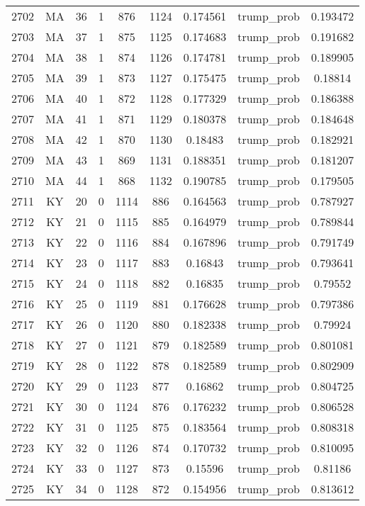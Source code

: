 \documentclass[12pt,a4paper]{article}
\begin{document}
\begin{tabular}{r|cccccccc}
	2702 & MA & 36 & 1 & 876 & 1124 & 0.174561 & trump\_prob & 0.193472 \\
	2703 & MA & 37 & 1 & 875 & 1125 & 0.174683 & trump\_prob & 0.191682 \\
	2704 & MA & 38 & 1 & 874 & 1126 & 0.174781 & trump\_prob & 0.189905 \\
	2705 & MA & 39 & 1 & 873 & 1127 & 0.175475 & trump\_prob & 0.18814 \\
	2706 & MA & 40 & 1 & 872 & 1128 & 0.177329 & trump\_prob & 0.186388 \\
	2707 & MA & 41 & 1 & 871 & 1129 & 0.180378 & trump\_prob & 0.184648 \\
	2708 & MA & 42 & 1 & 870 & 1130 & 0.18483 & trump\_prob & 0.182921 \\
	2709 & MA & 43 & 1 & 869 & 1131 & 0.188351 & trump\_prob & 0.181207 \\
	2710 & MA & 44 & 1 & 868 & 1132 & 0.190785 & trump\_prob & 0.179505 \\
	2711 & KY & 20 & 0 & 1114 & 886 & 0.164563 & trump\_prob & 0.787927 \\
	2712 & KY & 21 & 0 & 1115 & 885 & 0.164979 & trump\_prob & 0.789844 \\
	2713 & KY & 22 & 0 & 1116 & 884 & 0.167896 & trump\_prob & 0.791749 \\
	2714 & KY & 23 & 0 & 1117 & 883 & 0.16843 & trump\_prob & 0.793641 \\
	2715 & KY & 24 & 0 & 1118 & 882 & 0.16835 & trump\_prob & 0.79552 \\
	2716 & KY & 25 & 0 & 1119 & 881 & 0.176628 & trump\_prob & 0.797386 \\
	2717 & KY & 26 & 0 & 1120 & 880 & 0.182338 & trump\_prob & 0.79924 \\
	2718 & KY & 27 & 0 & 1121 & 879 & 0.182589 & trump\_prob & 0.801081 \\
	2719 & KY & 28 & 0 & 1122 & 878 & 0.182589 & trump\_prob & 0.802909 \\
	2720 & KY & 29 & 0 & 1123 & 877 & 0.16862 & trump\_prob & 0.804725 \\
	2721 & KY & 30 & 0 & 1124 & 876 & 0.176232 & trump\_prob & 0.806528 \\
	2722 & KY & 31 & 0 & 1125 & 875 & 0.183564 & trump\_prob & 0.808318 \\
	2723 & KY & 32 & 0 & 1126 & 874 & 0.170732 & trump\_prob & 0.810095 \\
	2724 & KY & 33 & 0 & 1127 & 873 & 0.15596 & trump\_prob & 0.81186 \\
	2725 & KY & 34 & 0 & 1128 & 872 & 0.154956 & trump\_prob & 0.813612 \\

\end{tabular}
\end{document}
